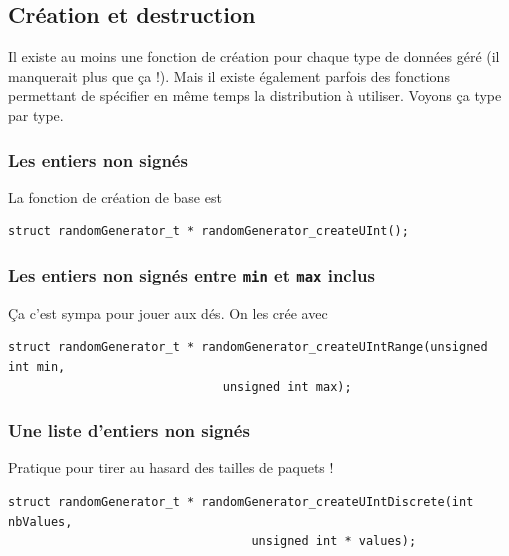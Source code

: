 \subsection{Création et destruction}

   Il existe au moins une fonction de création pour chaque type de
données géré (il manquerait plus que ça !). Mais il existe également
parfois des fonctions permettant de spécifier en même temps la
distribution à utiliser. Voyons ça type par type.

%
\subsubsection{Les entiers non signés}

   La fonction de création de base est 

\begin{verbatim}
struct randomGenerator_t * randomGenerator_createUInt();
\end{verbatim}

%
\subsubsection{Les entiers non signés entre {\tt min} et {\tt max} inclus}

   Ça c'est sympa pour jouer aux dés. On les crée avec 

\begin{verbatim}
struct randomGenerator_t * randomGenerator_createUIntRange(unsigned int min,
						      unsigned int max);
\end{verbatim}

%
\subsubsection{Une liste d'entiers non signés}

   Pratique pour tirer au hasard des tailles de paquets !

\begin{verbatim}
struct randomGenerator_t * randomGenerator_createUIntDiscrete(int nbValues,
							      unsigned int * values);
\end{verbatim}


